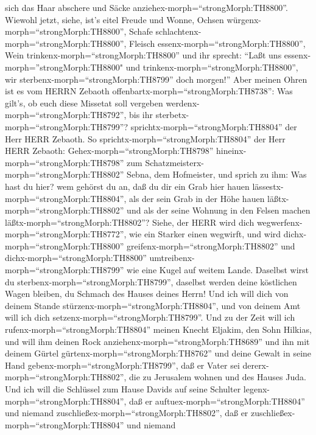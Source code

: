 sich das Haar abschere und Säcke anziehex-morph=``strongMorph:TH8800''.
 Wiewohl jetzt, siehe, ist's eitel Freude und Wonne, Ochsen
würgenx-morph=``strongMorph:TH8800'', Schafe
schlachtenx-morph=``strongMorph:TH8800'', Fleisch
essenx-morph=``strongMorph:TH8800'', Wein
trinkenx-morph=``strongMorph:TH8800'' und ihr sprecht: ``Laßt uns
essenx-morph=''strongMorph:TH8800" und
trinkenx-morph=``strongMorph:TH8800'', wir
sterbenx-morph=``strongMorph:TH8799'' doch morgen!''  Aber
meinen Ohren ist es vom HERRN Zebaoth
offenbartx-morph=``strongMorph:TH8738'': Was gilt's, ob euch diese
Missetat soll vergeben werdenx-morph=``strongMorph:TH8792'', bis ihr
sterbetx-morph=``strongMorph:TH8799''?
sprichtx-morph=``strongMorph:TH8804'' der Herr HERR Zebaoth.
 So sprichtx-morph=``strongMorph:TH8804'' der Herr HERR
Zebaoth: Gehex-morph=``strongMorph:TH8798''
hineinx-morph=``strongMorph:TH8798'' zum
Schatzmeisterx-morph=``strongMorph:TH8802'' Sebna, dem Hofmeister, und
sprich zu ihm:  Was hast du hier? wem gehörst du an, daß du
dir ein Grab hier hauen lässestx-morph=``strongMorph:TH8804'', als der
sein Grab in der Höhe hauen läßtx-morph=``strongMorph:TH8802'' und als
der seine Wohnung in den Felsen machen
läßtx-morph=``strongMorph:TH8802''?  Siehe, der HERR wird
dich wegwerfenx-morph=``strongMorph:TH8772'', wie ein Starker einen
wegwirft, und wird dichx-morph=``strongMorph:TH8800''
greifenx-morph=``strongMorph:TH8802''  und
dichx-morph=``strongMorph:TH8800''
umtreibenx-morph=``strongMorph:TH8799'' wie eine Kugel auf weitem Lande.
Daselbst wirst du sterbenx-morph=``strongMorph:TH8799'', daselbst werden
deine köstlichen Wagen bleiben, du Schmach des Hauses deines Herrn!
 Und ich will dich von deinem Stande
stürzenx-morph=``strongMorph:TH8804'', und von deinem Amt will ich dich
setzenx-morph=``strongMorph:TH8799''.  Und zu der Zeit will
ich rufenx-morph=``strongMorph:TH8804'' meinen Knecht Eljakim, den Sohn
Hilkias,  und will ihm deinen Rock
anziehenx-morph=``strongMorph:TH8689'' und ihn mit deinem Gürtel
gürtenx-morph=``strongMorph:TH8762'' und deine Gewalt in seine Hand
gebenx-morph=``strongMorph:TH8799'', daß er Vater sei
dererx-morph=``strongMorph:TH8802'', die zu Jerusalem wohnen und des
Hauses Juda.  Und ich will die Schlüssel zum Hause Davids
auf seine Schulter legenx-morph=``strongMorph:TH8804'', daß er
auftuex-morph=``strongMorph:TH8804'' und niemand
zuschließex-morph=``strongMorph:TH8802'', daß er
zuschließex-morph=``strongMorph:TH8804'' und niemand
